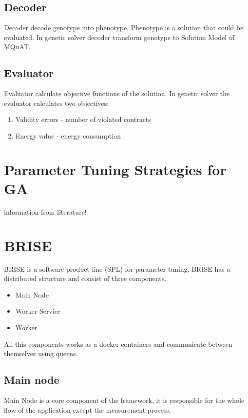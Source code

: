 
\subsection{Decoder}

Decoder decode genotype into phenotype.
Phenotype is a solution that could be evaluated.
In genetic solver decoder transform genotype to Solution Model of MQuAT.


\subsection{Evaluator}

Evaluator calculate objective functions of the solution. 
In genetic solver the evaluator calculates two objectives:

\begin{enumerate}
	\item Validity errors - number of violated contracts
	\item Energy value - energy consumption
\end{enumerate}

\section{Parameter Tuning Strategies for GA}
information from literature!

\section{BRISE}
BRISE is a software product line (SPL) for parameter tuning.
BRISE has a distributed structure and consist of three components.
\begin{itemize}
	\item Main Node
	\item Worker Service
	\item Worker
\end{itemize}
All this components works as a docker containers and communicate between themselves using queens. 

\subsection{Main node}
Main Node is a core component of the framework, it is responsible for the whole flow of the application except the measurement process.~\cite{pukhkaiev19} 

